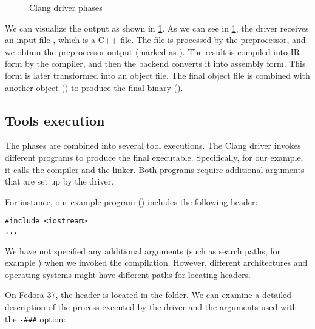 \begin{figure}
\begin{center}
\begin{adjustbox}{totalheight=\baselineskip}
    \end{adjustbox}
  \end{center}
  \caption{Clang driver phases}  
  \label{fig:clang_driver_phases}
\end{figure}

We can visualize the output as shown in \cref{fig:clang_driver_phases}. As we
can see in \cref{fig:clang_driver_phases}, the driver receives an input file
, which is a C++ file. The file is processed by the
preprocessor, and we obtain the preprocessor output (marked as
). The result is compiled into IR form by the compiler,
and then the backend converts it into assembly form. This form is later
transformed into an object file. The final object file is combined with another
object () to produce the final binary (). 


\subsection{Tools execution}
The phases are combined into several tool executions. The Clang driver invokes
different programs to produce the final executable. Specifically, for our
example, it calls the  compiler and the  linker. Both
programs require additional arguments that are set up by the driver.  

For instance, our example program () includes the following
header: 

\begin{verbatim}
#include <iostream>
...
\end{verbatim}

We have not specified any additional arguments (such as search paths, for
example ) when we invoked the compilation. However, different
architectures and operating systems might have different paths for locating
headers.  

On Fedora 37, the header is located in the
 folder. We can examine a detailed
description of the process executed by the driver and the arguments used with
the \texttt{-###} option: 


